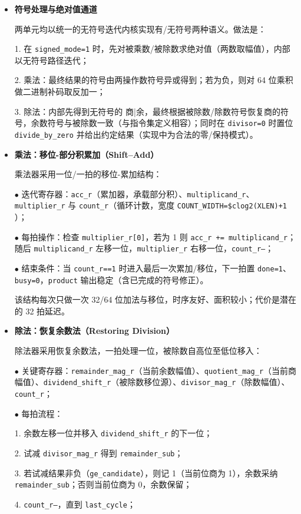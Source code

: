 \documentclass[11pt]{article}
\begin{document}
\begin{itemize}
\item \textbf{符号处理与绝对值通道} 
    
两单元均以统一的无符号迭代内核实现有/无符号两种语义。做法是：

1. 在 \texttt{signed\_mode=1} 时，先对被乘数/被除数求绝对值（两数取幅值），内部以无符号路径迭代；

2. 乘法：最终结果的符号由两操作数符号异或得到；若为负，则对 64 位乘积做二进制补码取反加一；

3. 除法：内部先得到无符号的 商|余，最终根据被除数/除数符号恢复商的符号，余数符号与被除数一致（与指令集定义相容）；同时在 \texttt{divisor=0} 时置位 \texttt{divide\_by\_zero} 并给出约定结果（实现中为合法的零/保持模式）。

\item \textbf{乘法：移位-部分积累加（Shift–Add）}
    
乘法器采用一位/一拍的移位-累加结构：

$\bullet$ 迭代寄存器：\texttt{acc\_r}（累加器，承载部分积）、\texttt{multiplicand\_r}、\texttt{multiplier\_r} 与 \texttt{count\_r}（循环计数，宽度 \texttt{COUNT\_WIDTH=\$clog2(XLEN)+1} ）；

$\bullet$ 每拍操作：检查 \texttt{multiplier\_r[0]}，若为 1 则 \texttt{acc\_r += multiplicand\_r}；随后 \texttt{multiplicand\_r} 左移一位，\texttt{multiplier\_r} 右移一位，\texttt{count\_r--}；

$\bullet$ 结束条件：当 \texttt{count\_r==1} 时进入最后一次累加/移位，下一拍置 \texttt{done=1}、\texttt{busy=0}，\texttt{product} 输出稳定（含已完成的符号修正）。

该结构每次只做一次 32/64 位加法与移位，时序友好、面积较小；代价是潜在的 32 拍延迟。

\item \textbf{除法：恢复余数法（Restoring Division）}

除法器采用恢复余数法，一拍处理一位，被除数自高位至低位移入：

$\bullet$ 关键寄存器：\texttt{remainder_mag_r}（当前余数幅值）、\texttt{quotient_mag_r}（当前商幅值）、\texttt{dividend_shift_r}（被除数移位源）、\texttt{divisor_mag_r}（除数幅值）、\texttt{count\_r}；

$\bullet$ 每拍流程：

\hspace{2em} 1. 余数左移一位并移入 \texttt{dividend\_shift\_r} 的下一位；

\hspace{2em} 2. 试减 \texttt{divisor\_mag\_r} 得到 \texttt{remainder\_sub}；

\hspace{2em} 3. 若试减结果非负（\texttt{ge\_candidate}），则记 1（当前位商为 1），余数采纳 \texttt{remainder\_sub}；否则当前位商为 0，余数保留；

\hspace{2em} 4. \texttt{count\_r--}，直到 \texttt{last\_cycle}；

\end{itemize}
\end{document}
